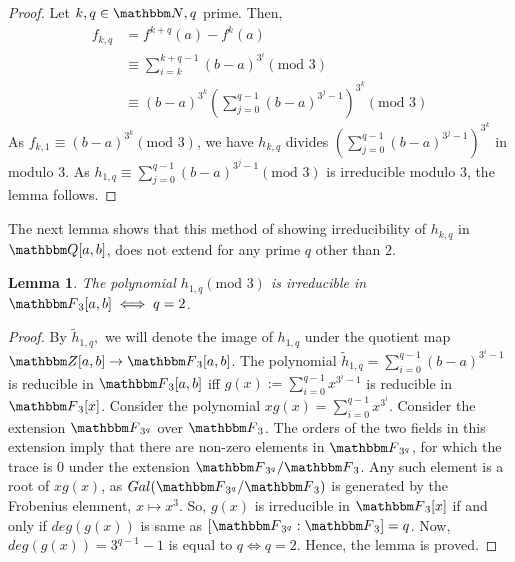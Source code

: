 \documentclass[reqno]{amsart}
\numberwithin{equation}{section}
\theoremstyle{plain}
\newtheorem{lemma}[theorem]{Lemma}
\theoremstyle{definition}
\theoremstyle{definition}
\newcommand{\Q}{{\mathbbm Q}}
\newcommand{\Z}{{\mathbbm Z}}
\newcommand{\N}{{\mathbbm N}}
\newcommand{\F}{{\mathbbm F}}
\begin{document}
    \begin{proof}
        Let $k,q\in \N, q$ prime. Then,
        \begin{align*}
            f_{k,q} & = f^{k+q}(a)- f^{k}(a)\\
            & \equiv \sum_{i=k}^{k+q-1} (b-a)^{3^{i}} (\text{mod }3)\\
            & \equiv (b-a)^{3^{k}} \left(\sum_{j=0}^{q-1} (b-a)^{3^{j}-1} \right)^{3^{k}} (\text{mod }3)
        \end{align*}
        As $f_{k,1}\equiv (b-a)^{3^{k}}(\text{mod } 3)$, we have $h_{k,q}$ divides $\left(\sum_{j=0}^{q-1} (b-a)^{3^{j}-1}\right)^{3^{k}}$ in modulo $3$. As $h_{1,q}\equiv \sum_{j=0}^{q-1} (b-a)^{3^{j}-1}( \text{mod }3)$ is irreducible modulo $3$, the lemma follows.
    \end{proof}
    The next lemma shows that this method of showing irreducibility of $h_{k,q}$ in $\Q[a,b]$, does not extend for any prime $q$ other than $2$.
    \begin{lemma}
        The polynomial $h_{1,q}(\text{mod }3)$ is irreducible in $\F_{3}[a,b] \iff q=2$.
    \end{lemma}
    \begin{proof}
        By $\tilde{h}_{1,q},$ we will denote the image of $h_{1,q}$ under the quotient map $\Z[a,b] \rightarrow \F_{3}[a,b]$. The polynomial $\tilde{h}_{1,q}= \sum_{i=0}^{q-1}(b-a)^{3^{i}-1}$ is reducible in $\F_{3}[a,b]$ iff $g(x):=\sum_{i=0}^{q-1}x^{3^{i}-1}$ is reducible in $\F_{3}[x]$. Consider the polynomial $xg(x)= \sum_{i=0}^{q-1}x^{3^{i}}$. Consider the extension $\F_{3^{q}}$ over $\F_{3}$. The orders of the two fields in this extension imply that there are non-zero elements in $\F_{3^{q}}$, for which the trace is $0$ under the extension $\F_{3^{q}}/\F_{3}$. Any such element is a root of $xg(x)$, as $Gal(\F_{3^{q}}/\F_{3})$ is generated by the Frobenius elemnent, $x\mapsto x^{3}$. So, $g(x)$ is irreducible in $\F_{3}[x]$ if and only if $deg(g(x))$ is same as 
        $[\F_{3^{q}}:\F_{3}]=q$. Now, $deg(g(x))=3^{q-1}-1$ is equal to $q\iff q=2$. Hence, the lemma is proved.  
    \end{proof}
\end{document}
